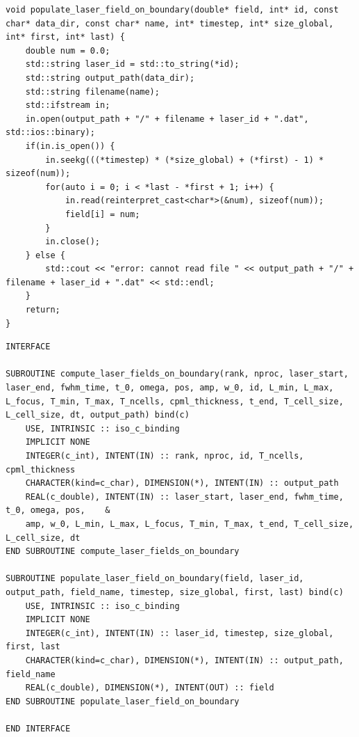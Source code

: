 \begin{lstlisting}[style=CXX, caption=Extern C++ function to fill Fortran arrays with laser fields dumped in binary file]
void populate_laser_field_on_boundary(double* field, int* id, const char* data_dir, const char* name, int* timestep, int* size_global, int* first, int* last) {
	double num = 0.0;
	std::string laser_id = std::to_string(*id);
	std::string output_path(data_dir);
	std::string filename(name);
	std::ifstream in;
	in.open(output_path + "/" + filename + laser_id + ".dat", std::ios::binary);
	if(in.is_open()) {
		in.seekg(((*timestep) * (*size_global) + (*first) - 1) * sizeof(num));
		for(auto i = 0; i < *last - *first + 1; i++) {
			in.read(reinterpret_cast<char*>(&num), sizeof(num));
			field[i] = num;
		}
		in.close();
	} else {
		std::cout << "error: cannot read file " << output_path + "/" + filename + laser_id + ".dat" << std::endl;
	}
	return;
}
\end{lstlisting}

\begin{lstlisting}[style=FORTRAN, caption=Fortran interfaces for C++ library functions]
INTERFACE

SUBROUTINE compute_laser_fields_on_boundary(rank, nproc, laser_start, laser_end, fwhm_time, t_0, omega, pos, amp, w_0, id, L_min, L_max, L_focus, T_min, T_max, T_ncells, cpml_thickness, t_end, T_cell_size, L_cell_size, dt, output_path) bind(c)
	USE, INTRINSIC :: iso_c_binding
	IMPLICIT NONE
	INTEGER(c_int), INTENT(IN) :: rank, nproc, id, T_ncells, cpml_thickness
	CHARACTER(kind=c_char), DIMENSION(*), INTENT(IN) :: output_path
	REAL(c_double), INTENT(IN) :: laser_start, laser_end, fwhm_time, t_0, omega, pos,    &
	amp, w_0, L_min, L_max, L_focus, T_min, T_max, t_end, T_cell_size, L_cell_size, dt
END SUBROUTINE compute_laser_fields_on_boundary

SUBROUTINE populate_laser_field_on_boundary(field, laser_id, output_path, field_name, timestep, size_global, first, last) bind(c)
	USE, INTRINSIC :: iso_c_binding
	IMPLICIT NONE
	INTEGER(c_int), INTENT(IN) :: laser_id, timestep, size_global, first, last
	CHARACTER(kind=c_char), DIMENSION(*), INTENT(IN) :: output_path, field_name
	REAL(c_double), DIMENSION(*), INTENT(OUT) :: field
END SUBROUTINE populate_laser_field_on_boundary

END INTERFACE
\end{lstlisting}

